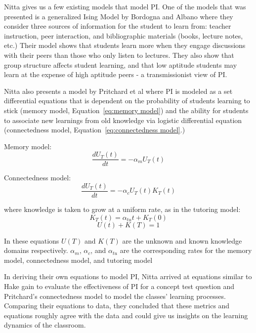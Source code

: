 \documentclass[twocolumn,secnumarabic,amssymb, nobibnotes, aps, prd]{revtex4-2}
\begin{document}
    Nitta \cite{nitta2019mathematical} gives us a few existing models that model PI. 
    One of the models that was presented is a generalized Ising Model by Bordogna and Albano \cite{bordogna2001theoretical,bordogna2003simulation} where they consider three sources of information for the student to learn from: teacher instruction, peer interaction, and bibliographic materials (books, lecture notes, etc.)
    Their model shows that students learn more when they engage discussions with their peers than those who only listen to lectures.
    They also show that group structure affects student learning, and that low aptitude students may learn at the expense of high aptitude peers - a transmissionist view of PI.

    Nitta also presents a model by Pritchard et al \cite{pritchard2008mathematical} where PI is modeled as a set differential equations that is dependent on the probability of students learning to stick (memory model, Equation~\ref{eq:memory model}) and the ability for students to associate new learnings from old knowledge via logistic differential equation (connectedness model, Equation~\ref{eq:connectedness model}.)

    Memory model:
    \begin{equation}
        \label{eq:memory model}
        \frac{dU_T(t)}{dt} = -\alpha_m U_T(t)
    \end{equation}

    Connectedness model:
    \begin{equation}
        \label{eq:connectedness model}
        \frac{dU_T(t)}{dt} = -\alpha_c U_T(t)K_T(t)
    \end{equation}

    where knowledge is taken to grow at a uniform rate, as in the tutoring model:
    \begin{equation}
        \label{eq:tutoring model}
        K_T(t) = \alpha_{tu}t + K_T(0)
    \end{equation}
    \begin{equation}
        U(t) + K(T) = 1
    \end{equation}

    In these equations $U(T)$ and $K(T)$ are the unknown and known knowledge domains respectively. $\alpha_m$, $\alpha_c$, and $\alpha_{tu}$ are the corresponding rates for the memory model, connectedness model, and tutoring model 

    In deriving their own equations to model PI, Nitta arrived at equations similar to Hake gain to evaluate the effectiveness of PI for a concept test question and Pritchard's connectedness model to model the classes' learning processes.
    Comparing their equations to data, they concluded that these metrics and equations roughly agree with the data and could give us insights on the learning dynamics of the classroom.
\end{document}
